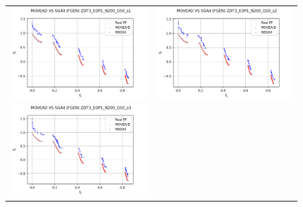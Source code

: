 \begin{figure}[H]
    \centering
    \begin{tabular}{c c}
    \includegraphics[scale=0.5]{figures/ZDT3_EOP1_N200_G50_T30/s1_comp.png} &
    \includegraphics[scale=0.5]{figures/ZDT3_EOP1_N200_G50_T30/s2_comp.png}\\
    \includegraphics[scale=0.5]{figures/ZDT3_EOP1_N200_G50_T30/s3_comp.png} &

\end{tabular}
\end{figure}
